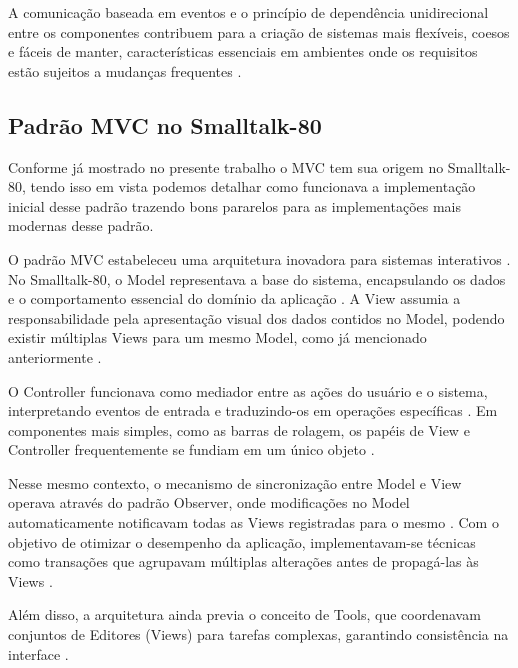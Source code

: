             \par A comunicação baseada em eventos e o princípio de dependência unidirecional entre os componentes contribuem para a criação de sistemas mais flexíveis, coesos e fáceis de manter, características essenciais em ambientes onde os requisitos estão sujeitos a mudanças frequentes \cite{artigo:deacon:2009}.

    \subsection{Padrão MVC no Smalltalk-80}

        \par Conforme já mostrado no presente trabalho o MVC tem sua origem no Smalltalk-80, tendo isso em vista podemos detalhar como funcionava a implementação inicial desse padrão trazendo bons pararelos para as implementações mais modernas desse padrão.
    
        \par O padrão MVC estabeleceu uma arquitetura inovadora para sistemas interativos \cite{artigo:reenskaug:2003}. No Smalltalk-80, o Model representava a base do sistema, encapsulando os dados e o comportamento essencial do domínio da aplicação \cite{artigo:reenskaug:2003}. A View assumia a responsabilidade pela apresentação visual dos dados contidos no Model, podendo existir múltiplas Views para um mesmo Model, como já mencionado anteriormente \cite{artigo:reenskaug:2003}.
        
        \par O Controller funcionava como mediador entre as ações do usuário e o sistema, interpretando eventos de entrada e traduzindo-os em operações específicas \cite{artigo:reenskaug:2003}. Em componentes mais simples, como as barras de rolagem, os papéis de View e Controller frequentemente se fundiam em um único objeto \cite{artigo:reenskaug:2003}.

        \par Nesse mesmo contexto, o mecanismo de sincronização entre Model e View operava através do padrão Observer, onde modificações no Model automaticamente notificavam todas as Views registradas para o mesmo \cite{artigo:reenskaug:2003}. Com o objetivo de otimizar o desempenho da aplicação, implementavam-se técnicas como transações que agrupavam múltiplas alterações antes de propagá-las às Views \cite{artigo:reenskaug:2003}.
        
        \par Além disso, a arquitetura ainda previa o conceito de Tools, que coordenavam conjuntos de Editores (Views) para tarefas complexas, garantindo consistência na interface \cite{artigo:reenskaug:2003}. 
        
